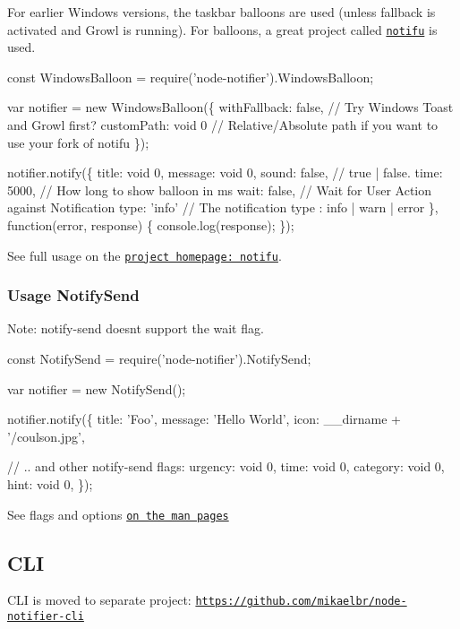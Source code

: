 For earlier Windows versions, the taskbar balloons are used (unless fallback is activated and Growl is running). For balloons, a great project called \href{http://www.paralint.com/projects/notifu/}{\tt notifu} is used.


\begin{DoxyCode}
const WindowsBalloon = require('node-notifier').WindowsBalloon;

var notifier = new WindowsBalloon(\{
  withFallback: false, // Try Windows Toast and Growl first?
  customPath: void 0 // Relative/Absolute path if you want to use your fork of notifu
\});

notifier.notify(\{
  title: void 0,
  message: void 0,
  sound: false, // true | false.
  time: 5000, // How long to show balloon in ms
  wait: false, // Wait for User Action against Notification
  type: 'info' // The notification type : info | warn | error
\}, function(error, response) \{
  console.log(response);
\});
\end{DoxyCode}


See full usage on the \href{http://www.paralint.com/projects/notifu/}{\tt project homepage\+: notifu}.

\subsubsection*{Usage Notify\+Send}

Note\+: notify-\/send doesn\textquotesingle{}t support the wait flag.


\begin{DoxyCode}
const NotifySend = require('node-notifier').NotifySend;

var notifier = new NotifySend();

notifier.notify(\{
  title: 'Foo',
  message: 'Hello World',
  icon: \_\_dirname + '/coulson.jpg',

  // .. and other notify-send flags:
  urgency: void 0,
  time: void 0,
  category: void 0,
  hint: void 0,
\});
\end{DoxyCode}


See flags and options \href{http://manpages.ubuntu.com/manpages/gutsy/man1/notify-send.1.html}{\tt on the man pages}

\subsection*{C\+LI}

C\+LI is moved to separate project\+: \href{https://github.com/mikaelbr/node-notifier-cli}{\tt https\+://github.\+com/mikaelbr/node-\/notifier-\/cli}

